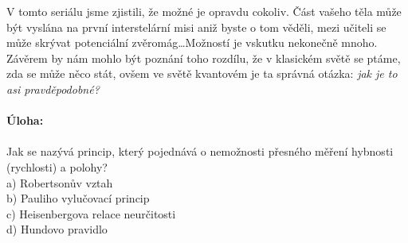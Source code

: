 \documentclass[crop=false]{standalone}
\begin{document}
V tomto seriálu jsme zjistili, že možné je opravdu cokoliv. Část vašeho těla může být vyslána na první interstelární misi aniž 
byste o tom věděli, mezi učiteli se může skrývat potenciální zvěromág\dots Možností je vskutku nekonečně mnoho. Závěrem by nám 
mohlo být poznání toho rozdílu, že v klasickém světě se ptáme, zda se může něco stát, ovšem ve světě kvantovém je ta správná 
otázka: \textit{jak je to asi pravděpodobné?}
\\
\\
\textbf{Úloha:}
\\
\\
Jak se nazývá princip, který pojednává o nemožnosti přesného měření hybnosti (rychlosti) a polohy?
\\

a) Robertsonův vztah
\\

b) Pauliho vylučovací princip
\\

c) Heisenbergova relace neurčitosti
\\

d) Hundovo pravidlo
\end{document}
